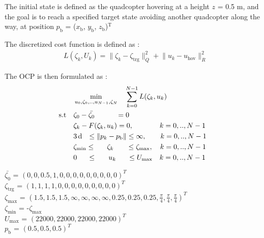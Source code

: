 \documentclass[conference]{IEEEtran}
\begin{document}
The initial state is defined as the quadcopter hovering at a height $z$ = 0.5 m, and the goal is to reach a specified target state avoiding another quadcopter along the way, at position  $p_\mathrm{b}$ = ($x_\mathrm{b}$, $y_\mathrm{b}$, $z_\mathrm{b}$)$\mathrm{^{T}}$

The discretized cost function is defined as :
\begin{align}
	& L\left(\zeta_k, U_k\right) = \lVert \zeta_k - \zeta_{\mathrm{trg}} \rVert^2_Q + \lVert u_k - u_{\mathrm{hov}} \rVert^2_R
\end{align}

The OCP is then formulated as :
\begin{align}
	&\min_{u_0,\zeta_0,..,u_{N-1},\zeta_N} \quad \sum_{k = 0}^{N-1} L(\zeta_k, u_k) \\
	\text{s.t} \quad 
	& \zeta_0 - \bar{\zeta_0} \hspace{0.42in} = 0\\
    & \zeta_k - F(\zeta_k, u_k) = 0, \hspace{0.1in}\quad\qquad k = 0,..,N-1 \\
    & 3\,\mathrm{d} \hspace{0.1in} \le \lVert p_k - p_{\mathrm{b}} \rVert \le  \infty, \qquad  k = 0,..,N-1 \\
	& \zeta_{\mathrm{min}} \le \hspace{0.22in} \zeta_k \hspace{0.25in} \le \zeta_{\mathrm{max}}, \quad k = 0,..,N-1 \\
    & 0 \hspace{0.2in} \le \hspace{0.23in} u_k \hspace{0.22in} \le U_{\mathrm{max}} \quad k = 0,..,N-1
\end{align}

\begin{flushleft}
$\bar{\zeta_0}$ \hspace{0.18in}= $(0, 0, 0.5, 1, 0, 0, 0, 0, 0, 0, 0, 0, 0)^T$\\
$\zeta_{\mathrm{trg}}$ \hspace{0.08in}= $( 1, 1, 1, 1, 0, 0, 0, 0, 0, 0, 0, 0, 0)^T$\\
$\zeta_{\mathrm{max}}$ \hspace{0.03in}= $(1.5,1.5,1.5,\infty,\infty,\infty,\infty,0.25,0.25,0.25,\frac{\pi}{4},\frac{\pi}{4},\frac{\pi}{4})^T$\\
$\zeta_{\mathrm{min}}$ \hspace{0.05in}= -$\zeta_{\mathrm{max}}$\\
$U_{\mathrm{max}}$ = $(22000, 22000, 22000, 22000)^T$\\
$p_\mathrm{b}$ \hspace{0.18in}= $(0.5, 0.5, 0.5)^T$\\
\end{flushleft}
\end{document}
